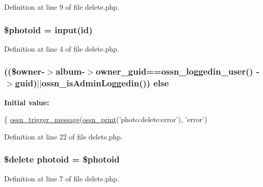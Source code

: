 Definition at line 9 of file delete.\+php.

\subsubsection[{\texorpdfstring{\$photoid}{$photoid}}]{\setlength{\rightskip}{0pt plus 5cm}\${\bf photoid} = {\bf input}(\textquotesingle{}id\textquotesingle{})}\hypertarget{components_2_ossn_photos_2actions_2photo_2delete_8php_a7407adedcade878fe9a46a9abd70298f}{}\label{components_2_ossn_photos_2actions_2photo_2delete_8php_a7407adedcade878fe9a46a9abd70298f}


Definition at line 4 of file delete.\+php.

\subsubsection[{\texorpdfstring{else}{else}}]{ ((\$owner-\/$>$album-\/$>${\bf owner\+\_\+guid}=={\bf ossn\+\_\+loggedin\+\_\+user}() -\/$>$guid)$\vert$$\vert${\bf ossn\+\_\+is\+Admin\+Loggedin}()) else}\hypertarget{components_2_ossn_photos_2actions_2photo_2delete_8php_adafcbfeb696ceaebd2ff640ba0710345}{}\label{components_2_ossn_photos_2actions_2photo_2delete_8php_adafcbfeb696ceaebd2ff640ba0710345}
{\bfseries Initial value\+:}
\begin{DoxyCode}
\{
    \hyperlink{ossn_8lib_8system_8php_ab3f23f23f32f50c12e7aea0ffaccaac7}{ossn\_trigger\_message}(\hyperlink{ossn_8lib_8languages_8php_a2be5d1c4b695593a9b9067b96df2150a}{ossn\_print}(\textcolor{stringliteral}{'photo:delete:error'}), \textcolor{stringliteral}{'error'})
\end{DoxyCode}


Definition at line 22 of file delete.\+php.

\subsubsection[{\texorpdfstring{photoid}{photoid}}]{\setlength{\rightskip}{0pt plus 5cm}\$delete photoid = \$photoid}\hypertarget{components_2_ossn_photos_2actions_2photo_2delete_8php_abb6af812fbce2cbbad5fc22cdbb4d396}{}\label{components_2_ossn_photos_2actions_2photo_2delete_8php_abb6af812fbce2cbbad5fc22cdbb4d396}


Definition at line 7 of file delete.\+php.

